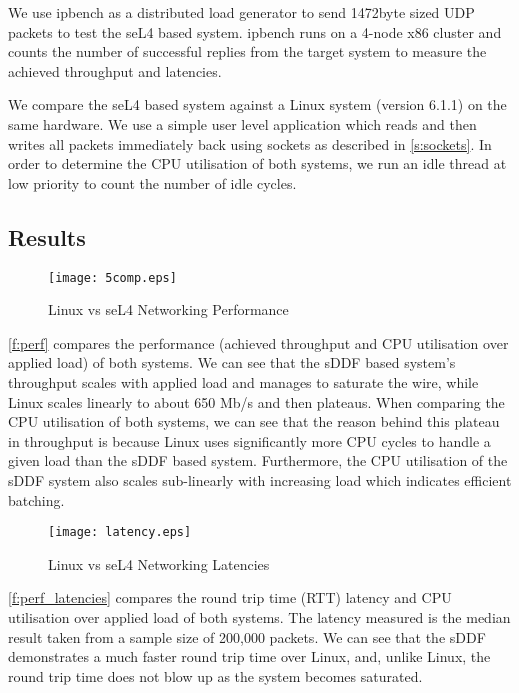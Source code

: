 We use ipbench \cite{Wienand_Macpherson_04} as a distributed load generator to send 1472byte sized UDP packets to test the seL4 based system. 
ipbench runs on a 4-node x86 cluster and counts the number of successful replies from the target system to measure the achieved throughput and latencies.

We compare the seL4 based system against a Linux system (version 6.1.1) on the same hardware. We use a simple user level application which 
reads and then writes all packets immediately back using sockets as described in \ref{s:sockets}. 
In order to determine the CPU utilisation of both systems, we run an idle thread at low priority to count the number of idle cycles. 

\subsection{Results}

\begin{figure}[h]
    \centering
    \texttt{[image: 5comp.eps]}
    \caption{Linux vs seL4 Networking Performance}
    \label{f:perf}
\end{figure}

\autoref{f:perf} compares the performance (achieved throughput and CPU utilisation over applied load) of both systems. 
We can see that the sDDF based system's throughput scales with applied load and manages to saturate the wire, while
Linux scales linearly to about 650 Mb/s and then plateaus. When comparing the CPU utilisation of both systems, we
can see that the reason behind this plateau in throughput is because Linux uses significantly more CPU cycles 
to handle a given load than the sDDF based system. Furthermore, the CPU utilisation of the sDDF system also scales 
sub-linearly with increasing load which indicates efficient batching.

\begin{figure}[h]
    \centering
    \texttt{[image: latency.eps]}
    \caption{Linux vs seL4 Networking Latencies}
    \label{f:perf_latencies}
\end{figure}

\autoref{f:perf_latencies} compares the round trip time (RTT) latency and CPU utilisation over applied load of both systems. The latency measured
is the median result taken from a sample size of 200,000 packets. We can see that the sDDF demonstrates a much faster round trip time over Linux, 
and, unlike Linux, the round trip time does not blow up as the system becomes saturated. 

